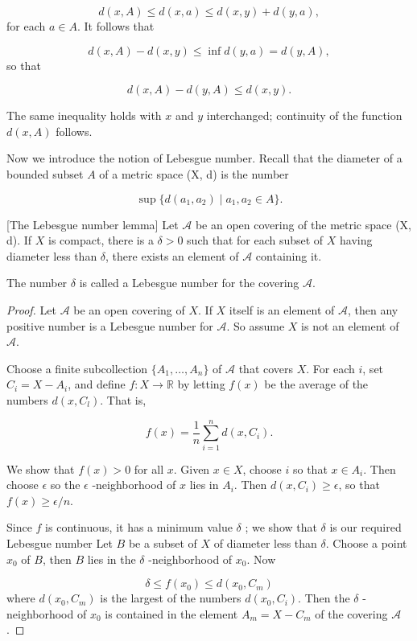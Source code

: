 \[
d( {x,A}) \leq d( {x,a}) \leq d( {x,y}) + d( {y,a}),
\]
for each \(a \in A\). It follows that

\[
d( {x,A}) - d( {x,y}) \leq \inf d( {y,a}) = d( {y,A}),
\]
so that

\[
d( {x,A}) - d( {y,A}) \leq d( {x,y}).
\]

The same inequality holds with \(x\) and \(y\) interchanged; continuity of the function \(d( {x,A})\) follows.

Now we introduce the notion of Lebesgue number. Recall that the diameter of a bounded subset \(A\) of a metric space (X, d) is the number

\[
\sup \{ {d( {a_{1},a_{2}}) \mid {a}_{1},a_{2} \in A}\}.
\]

\begin{lemma}
\label{lem:\thetheorem}[The Lebesgue number lemma]
 Let \(\mathcal{A}\) be an open covering of the metric space (X, d). If \(X\) is compact, there is a \(\delta > 0\) such that for each subset of \(X\) having diameter less than \(\delta\), there exists an element of \(\mathcal{A}\) containing it.
\end{lemma}

The number \(\delta\) is called a Lebesgue number for the covering \(\mathcal{A}\).

\begin{proof}
Let \(\mathcal{A}\) be an open covering of \(X\). If \(X\) itself is an element of \(\mathcal{A}\), then any positive number is a Lebesgue number for \(\mathcal{A}\). So assume \(X\) is not an element of \(\mathcal{A}\).

Choose a finite subcollection \(\{ {A_{1},\ldots ,A_{n}}\}\) of \(\mathcal{A}\) that covers \(X\). For each \(i\), set \(C_{i} = X - A_{i}\), and define \(f : X \rightarrow \mathbb{R}\) by letting \(f(x)\) be the average of the numbers \(d( {x,C_{l}})\). That is,

\[
f(x) = \frac{1}{n}\mathop{\sum }\limits_{{i = 1}}^{n}d( {x,C_{i}}).
\]

We show that \(f(x) > 0\) for all \(x\). Given \(x \in X\), choose \(i\) so that \(x \in {A}_{i}\). Then choose \(\epsilon\) so the \(\epsilon\) -neighborhood of \(x\) lies in \(A_{i}\). Then \(d( {x,C_{i}}) \geq \epsilon\), so that \(f(x) \geq \epsilon /n\).

Since \(f\) is continuous, it has a minimum value \(\delta\) ; we show that \(\delta\) is our required Lebesgue number Let \(B\) be a subset of \(X\) of diameter less than \(\delta\). Choose a point \(x_{0}\) of \(B\), then \(B\) lies in the \(\delta\) -neighborhood of \(x_{0}\). Now

\[
\delta \leq f( x_{0}) \leq d( {x_{0},C_{m}})
\]
where \(d( {x_{0},C_{m}})\) is the largest of the numbers \(d( {x_{0},C_{i}})\). Then the \(\delta\) -neighborhood of \(x_{0}\) is contained in the element \(A_{m} = X - C_{m}\) of the covering \(\mathcal{A}\).
\end{proof}

